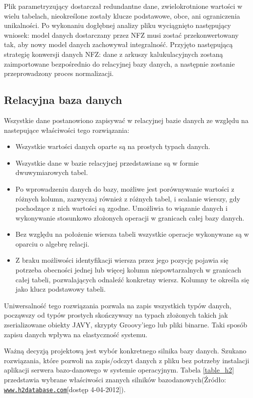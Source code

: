 Plik parametryzujący dostarczał redundantne dane, zwielokrotnione wartości w wielu tabelach, nieokreślone zostały klucze podstawowe, obce, ani ograniczenia unikalności. Po wykonaniu dogłębnej analizy pliku wyciągnięto następujący wniosek: model danych dostarczany przez NFZ musi zostać przekonwertowany tak, aby nowy model danych zachowywał integralność. Przyjęto następującą strategię konwersji danych NFZ: dane z arkuszy kalukulacyjnych zostaną zaimportowane bezpośrednio do relacyjnej bazy danych, a następnie zostanie przeprowadzony proces normalizacji.

\subsection{Relacyjna baza danych}
\label{sec:relacyjnaBazaDanych}

Wszystkie dane postanowiono zapisywać w relacyjnej bazie danych ze względu na nastepujące właściwości tego rozwiązania\cite{bazy_mimuw}:
\begin{itemize}
 \item Wszystkie wartości danych oparte są na prostych typach danych.
 \item Wszystkie dane w bazie relacyjnej przedstawiane są w formie dwuwymiarowych tabel.
 \item Po wprowadzeniu danych do bazy, możliwe jest porównywanie wartości z różnych kolumn, zazwyczaj również z różnych tabel, i scalanie wierszy, gdy pochodzące z nich wartości są zgodne. Umożliwia to wiązanie danych i wykonywanie stosunkowo złożonych operacji w granicach całej bazy danych.
 \item Bez względu na położenie wiersza tabeli wszystkie operacje wykonywane są w oparciu o algebrę relacji.
 \item Z braku możliwości identyfikacji wiersza przez jego pozycję pojawia się potrzeba obecności jednej lub więcej kolumn niepowtarzalnych w granicach całej tabeli, pozwalających odnaleźć konkretny wiersz. Kolumny te określa się jako klucz podstawowy tabeli.
\end{itemize}
Uniwersalność tego rozwiązania pozwala na zapis wszystkich typów danych, począwszy od typów prostych skończywszy na typach złożonych takich jak zserializowane obiekty JAVY, skrypty Groovy'iego lub pliki binarne. Taki sposób zapisu danych wpływa na elastyczność systemu.

Ważną decyzją projektową jest wybór konkretnego silnika bazy danych. Szukano rozwiązania, które pozwoli na zapis/odczyt danych z pliku bez potrzeby instalacji aplikacji serwera bazo-danowego w systemie operacyjnym. Tabela \ref{table_h2} przedstawia wybrane właściwości znanych silników bazodanowych(Źródło: \underline{\texttt{www.h2database.com}}[dostęp 4-04-2012]).

